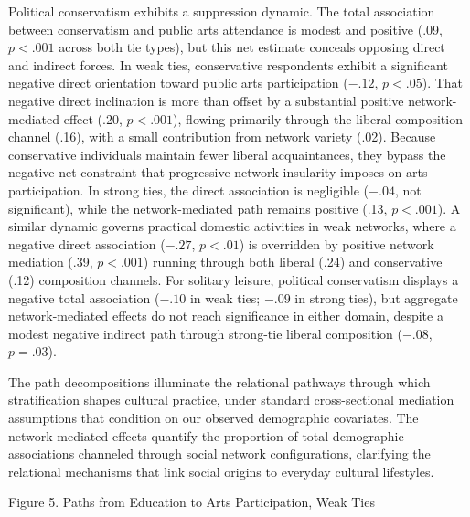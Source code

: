 \documentclass[
  12pt
]{article}
\begin{document}
Political conservatism exhibits a suppression dynamic. The total association between conservatism and public arts attendance is modest and positive (.09, $p < .001$ across both tie types), but this net estimate conceals opposing direct and indirect forces. In weak ties, conservative respondents exhibit a significant negative direct orientation toward public arts participation ($-.12$, $p < .05$). That negative direct inclination is more than offset by a substantial positive network-mediated effect (.20, $p < .001$), flowing primarily through the liberal composition channel (.16), with a small contribution from network variety (.02). Because conservative individuals maintain fewer liberal acquaintances, they bypass the negative net constraint that progressive network insularity imposes on arts participation. In strong ties, the direct association is negligible ($-.04$, not significant), while the network-mediated path remains positive (.13, $p < .001$). A similar dynamic governs practical domestic activities in weak networks, where a negative direct association ($-.27$, $p < .01$) is overridden by positive network mediation (.39, $p < .001$) running through both liberal (.24) and conservative (.12) composition channels. For solitary leisure, political conservatism displays a negative total association ($-.10$ in weak ties; $-.09$ in strong ties), but aggregate network-mediated effects do not reach significance in either domain, despite a modest negative indirect path through strong-tie liberal composition ($-.08$, $p = .03$).

The path decompositions illuminate the relational pathways through which stratification shapes cultural practice, under standard cross-sectional mediation assumptions that condition on our observed demographic covariates. The network-mediated effects quantify the proportion of total demographic associations channeled through social network configurations, clarifying the relational mechanisms that link social origins to everyday cultural lifestyles.

Figure 5. Paths from Education to Arts Participation, Weak Ties
\end{document}

